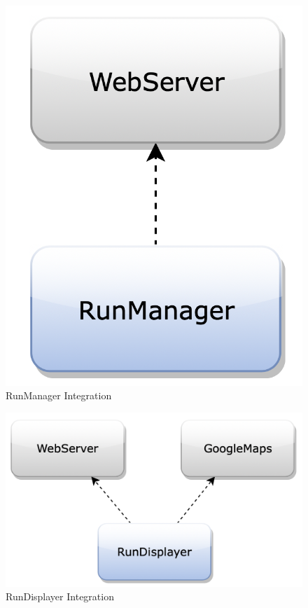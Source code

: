 \begin{figure}[H]
\begin{center}
\begin{minipage}[c]{.40\textwidth}
\includegraphics[scale=0.35,valign=t]{Images/IntegrationPlanImages/fig13.png}
\vspace{0.3cm}
\caption{RunManager Integration}
        \end{minipage}
      \end{center}
      \vspace{0.8cm}
\end{figure}

\begin{figure}[H]
\centering
\includegraphics[scale=0.35]{Images/IntegrationPlanImages/fig14.png}
\caption{RunDisplayer Integration}
\end{figure}

